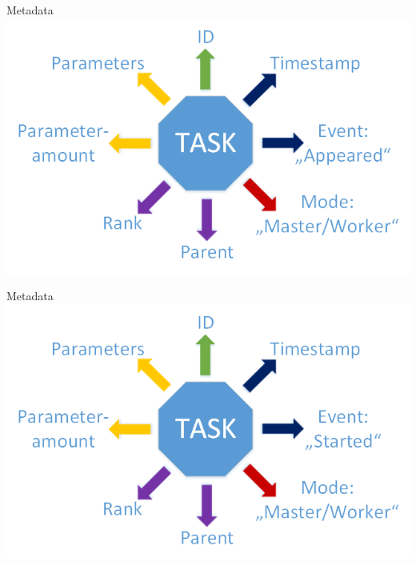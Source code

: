 


	
	
	
	
	
	\begin{frame}{Metadata}
	\includegraphics[width=1.0\textwidth]{images/Task/Zeichnung1.png}
	\end{frame}
	
	\begin{frame}{Metadata}
	\includegraphics[width=1.0\textwidth]{images/Task/Zeichnung2.png}
	\end{frame}
	
